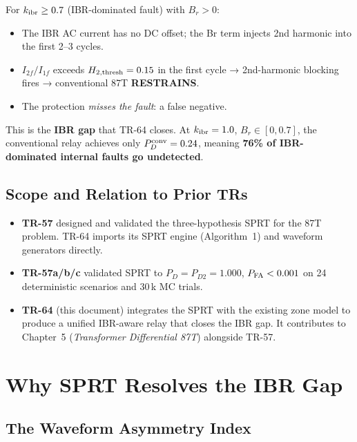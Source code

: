\documentclass[11pt, a4paper]{article}
\newcommand{\kibr}{k_{\rm ibr}}
\begin{document}
For $\kibr \geq 0.7$ (IBR-dominated fault) with $B_r > 0$:
\begin{itemize}
  \item The IBR AC current has no DC offset; the Br term injects 2nd harmonic
    into the first 2--3 cycles.
  \item $I_{2f}/I_{1f}$ exceeds $H_{2,\rm thresh} = 0.15$ in the first cycle
    → 2nd-harmonic blocking fires → conventional 87T \textbf{RESTRAINS}.
  \item The protection \emph{misses the fault}: a false negative.
\end{itemize}

This is the \textbf{IBR gap} that TR-64 closes.  At $\kibr = 1.0$,
$B_r \in [0, 0.7]$, the conventional relay achieves only
$P_D^{\rm conv} = 0.24$, meaning \textbf{76\% of IBR-dominated internal
faults go undetected}.

\subsection{Scope and Relation to Prior TRs}

\begin{itemize}
  \item \textbf{TR-57} \cite{SAMBP_TR57} designed and validated the
    three-hypothesis SPRT for the 87T problem.  TR-64 imports its SPRT
    engine (Algorithm~1) and waveform generators directly.
  \item \textbf{TR-57a/b/c} validated SPRT to $P_D = P_{D2} = 1.000$,
    $P_{\rm FA} < 0.001$ on 24 deterministic scenarios and 30\,k MC trials.
  \item \textbf{TR-64} (this document) integrates the SPRT with the existing
    zone model to produce a unified IBR-aware relay that closes the IBR gap.
    It contributes to Chapter~5 (\emph{Transformer Differential 87T})
    alongside TR-57.
\end{itemize}


\section{Why SPRT Resolves the IBR Gap}
\label{sec:sprt_ibr}

\subsection{The Waveform Asymmetry Index}
\end{document}
